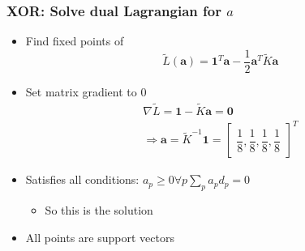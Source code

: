 \documentclass[12pt,notes,mathserif]{beamer}
\begin{document}
\begin{frame}[c]
\frametitle{XOR: Solve dual Lagrangian for $a$}
\begin{itemize}
\item Find fixed points of
\[\tilde{L}(\mathbf{a})=\mathbf{1}^T\mathbf{a}-\dfrac{1}{2}\mathbf{a}^T\tilde{K}\mathbf{a}
\]
\item Set matrix gradient to 0
\begin{gather*}
\nabla \tilde{L}=\mathbf{1}-\tilde{K}\mathbf{a}=\mathbf{0}\\
\Rightarrow \mathbf{a}=\tilde{K}^{-1}\mathbf{1}=\begin{bmatrix}
\dfrac{1}{8},\dfrac{1}{8},\dfrac{1}{8},\dfrac{1}{8}
\end{bmatrix}^T
\end{gather*}
\item Satisfies all conditions: $a_p\geqslant{}0 \forall p$\qquad $\sum_pa_pd_p=0$
\begin{itemize}
\item So this is the solution
\end{itemize}
\item All points are support vectors
\end{itemize}
\end{frame}
\end{document}
